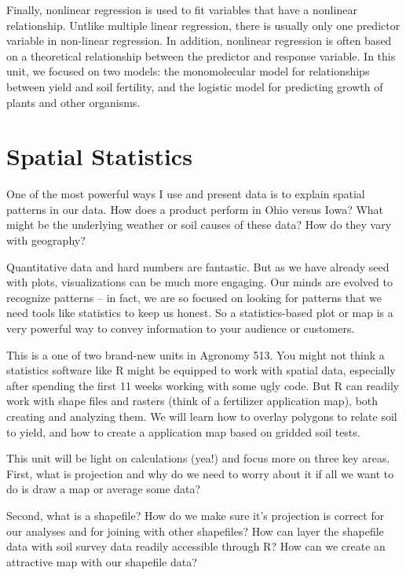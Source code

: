 \documentclass[
]{book}
\begin{document}
Finally, nonlinear regression is used to fit variables that have a nonlinear relationship. Untlike multiple linear regression, there is usually only one predictor variable in non-linear regression. In addition, nonlinear regression is often based on a theoretical relationship between the predictor and response variable. In this unit, we focused on two models: the monomolecular model for relationships between yield and soil fertility, and the logistic model for predicting growth of plants and other organisms.

\hypertarget{spatial-statistics}{%
\chapter{Spatial Statistics}\label{spatial-statistics}}

One of the most powerful ways I use and present data is to explain spatial patterns in our data. How does a product perform in Ohio versus Iowa? What might be the underlying weather or soil causes of these data? How do they vary with geography?

Quantitative data and hard numbers are fantastic. But as we have already seed with plots, visualizations can be much more engaging. Our minds are evolved to recognize patterns -- in fact, we are so focused on looking for patterns that we need tools like statistics to keep us honest. So a statistics-based plot or map is a very powerful way to convey information to your audience or customers.

This is a one of two brand-new units in Agronomy 513. You might not think a statistics software like R might be equipped to work with spatial data, especially after spending the first 11 weeks working with some ugly code. But R can readily work with shape files and rasters (think of a fertilizer application map), both creating and analyzing them. We will learn how to overlay polygons to relate soil to yield, and how to create a application map based on gridded soil tests.

This unit will be light on calculations (yea!) and focus more on three key areas. First, what is projection and why do we need to worry about it if all we want to do is draw a map or average some data?

Second, what is a shapefile? How do we make sure it's projection is correct for our analyses and for joining with other shapefiles? How can layer the shapefile data with soil survey data readily accessible through R? How can we create an attractive map with our shapefile data?
\end{document}
